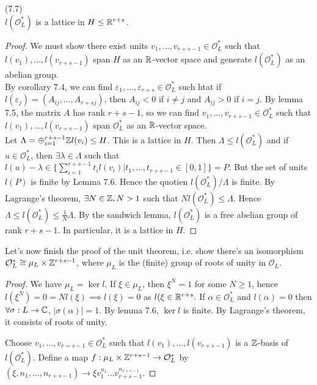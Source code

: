 \documentclass[a4paper]{article}
\begin{document}
\begin{prop} (7.7)\\
$l(\mathcal{O}_L^*)$ is a lattice in $H \leq \mathbb{R}^{r+s}$.
\begin{proof}
We must show there exist units $v_1,...,v_{r+s-1} \in \mathcal{O}_L^*$ such that $l(v_1),...,l(v_{r+s-1})$ span $H$ as an $\mathbb{R}$-vector space and generate $l(\mathcal{O}_L^*)$ as an abelian group.\\
By corollary 7.4, we can find $\varepsilon_1,...,\varepsilon_{r+s} \in \mathcal{O}_L^*$ such htat if $l(\varepsilon_j) = (A_{ij},...,A_{r+sj})$, then $A_{ij} < 0$ if $i \neq j$ and $A_{ij} > 0$ if $i = j$. By lemma 7.5, the matrix $A$ has rank $r+s-1$, so we can find $v_1,...,v_{r+s-1} \in \mathcal{O}_L^*$ such that $l(v_1),...,l(v_{r+s-1})$ span $\mathcal{O}_L^*$ as an $\mathbb{R}$-vector space.\\
Let $\Lambda = \oplus_{i=1}^{r+s-1} \mathbb{Z} l(v_i) \leq H$. This is a lattice in $H$. Then $\Lambda \leq l(\mathcal{O}_L^*)$ and if $u \in \mathcal{O}_L^*$, then $\exists \lambda \in \Lambda$ such that $l(u) - \lambda \in \{\sum_{i=1}^{r+s-1} t_i l(v_i) | t_1,...,t_{r+s-1} \in [0,1]\}=P$. But the set of units $l(P)$ is finite by Lemma 7.6. Hence the quotien $l(\mathcal{O}_L^*) / \Lambda$ is finite. By Lagrange's theorem, $\exists N \in \mathbb{Z}, N > 1$ such that $N l(\mathcal{O}_L^*) \leq \Lambda$. Hence $\Lambda \leq l(\mathcal{O}_L^*) \leq \frac{1}{N}\Lambda$. By the sandwich lemma, $l(\mathcal{O}_L^*)$ is a free abelian group of rank $r+s-1$. In particular, it is a lattice in $H$.
\end{proof}
\end{prop}

Let's now finish the proof of the unit theorem, i.e. show there's an isomorphism $\mathcal{O}_L^* \cong \mu_L \times \mathbb{Z}^{r+s-1}$, where $\mu_L$ is the (finite) group of roots of unity in $\mathcal{O}_L$.

\begin{proof}
We have $\mu_L = \ker l$. If $\xi \in \mu_L$, then $\xi^N = 1$ for some $N\geq 1$, hence $l(\xi^N) = 0 = N l(\xi) \implies l(\xi) = 0$ as $l(\xi \in \mathbb{R}^{r+s}$. If $\alpha \in \mathcal{O}_L^*$ and $l(\alpha) = 0$ then $\forall \sigma: L \to \mathbb{C}$, $|\sigma(\alpha)| = 1$. By lemma 7.6, $\ker l$ is finite. By Lagrange's theorem, it consists of roots of unity.

Choose $v_1,...,v_{r=s-1} \in \mathcal{O}_L^*$ such that $l(v_1),...,l(v_{r+s-1})$ is a $\mathbb{Z}$-basis of $l(\mathcal{O}_L^*)$. Define a map $f:\mu_L \times \mathbb{Z}^{r+s-1} \to \mathcal{O}_L^*$ by $(\xi,n_1,...,n_{r+s-1}) \to \xi v_1^{n_1} ... v_{r+s-1}^{n_{r+s-1}}$.
\end{proof}
\end{document}
